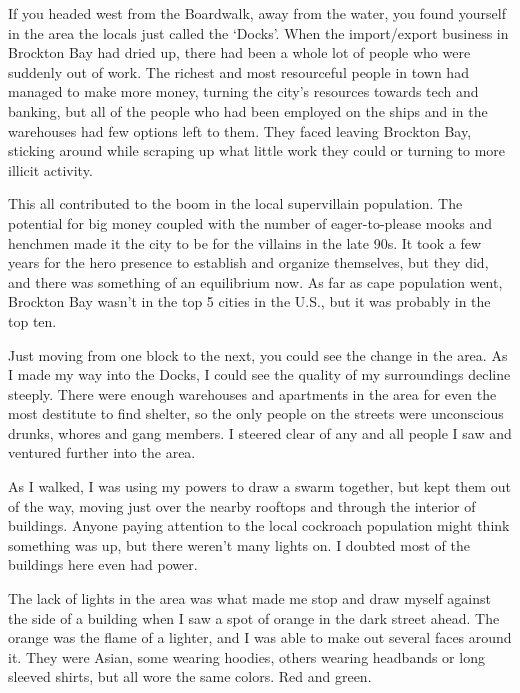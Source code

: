 If you headed west from the Boardwalk, away from the water, you found yourself in the area the locals just called the `Docks'.  When the import/export business in Brockton Bay had dried up, there had been a whole lot of people who were suddenly out of work.  The richest and most resourceful people in town had managed to make more money, turning the city's resources towards tech and banking, but all of the people who had been employed on the ships and in the warehouses had few options left to them.  They faced leaving Brockton Bay, sticking around while scraping up what little work they could or turning to more illicit activity.



This all contributed to the boom in the local supervillain population.  The potential for big money coupled with the number of eager-to-please mooks and henchmen made it the city to be for the villains in the late 90s.  It took a few years for the hero presence to establish and organize themselves, but they did, and there was something of an equilibrium now.  As far as cape population went, Brockton Bay wasn't in the top 5 cities in the U.S., but it was probably in the top ten.



Just moving from one block to the next, you could see the change in the area.  As I made my way into the Docks, I could see the quality of my surroundings decline steeply.  There were enough warehouses and apartments in the area for even the most destitute to find shelter, so the only people on the streets were unconscious drunks, whores and gang members.  I steered clear of any and all people I saw and ventured further into the area.



As I walked, I was using my powers to draw a swarm together, but kept them out of the way, moving just over the nearby rooftops and through the interior of buildings.  Anyone paying attention to the local cockroach population might think something was up, but there weren't many lights on.  I doubted most of the buildings here even had power.



The lack of lights in the area was what made me stop and draw myself against the side of a building when I saw a spot of orange in the dark street ahead.  The orange was the flame of a lighter, and I was able to make out several faces around it.  They were Asian, some wearing hoodies, others wearing headbands or long sleeved shirts, but all wore the same colors.  Red and green.




